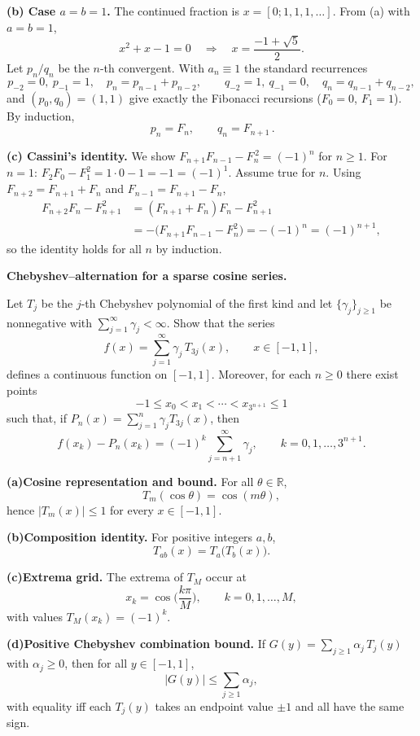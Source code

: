\begin{solution}
\textbf{(b) Case $a=b=1$.}
	The continued fraction is $x=[0;1,1,1,\ldots]$. From (a) with $a=b=1$,
	\[
	x^2+x-1=0 \quad\Rightarrow\quad x=\frac{-1+\sqrt5}{2}.
	\]
	Let $p_n/q_n$ be the $n$-th convergent. With $a_n\equiv1$ the standard recurrences
	\[
	p_{-2}=0,\ p_{-1}=1,\quad p_n=p_{n-1}+p_{n-2},\qquad
	q_{-2}=1,\ q_{-1}=0,\quad q_n=q_{n-1}+q_{n-2},
	\]
	and $(p_0,q_0)=(1,1)$ give exactly the Fibonacci recursions
	($F_0=0$, $F_1=1$). By induction,
	\[
	\boxed{\,p_n=F_n,\qquad q_n=F_{n+1}\,}.
	\]

	\medskip
	\textbf{(c) Cassini's identity.}
	We show $F_{n+1}F_{n-1}-F_n^{\,2}=(-1)^n$ for $n\ge1$.
	For $n=1$: $F_2F_0-F_1^2=1\cdot0-1=-1=(-1)^1$.
	Assume true for $n$. Using $F_{n+2}=F_{n+1}+F_n$ and $F_{n-1}=F_{n+1}-F_n$,
	\[
	\begin{aligned}
		F_{n+2}F_n - F_{n+1}^2
		&=(F_{n+1}+F_n)F_n - F_{n+1}^2\\
		&= -\bigl(F_{n+1}F_{n-1}-F_n^2\bigr)
		= -(-1)^n = (-1)^{n+1},
	\end{aligned}
	\]
	so the identity holds for all $n$ by induction.
\end{solution}

\begin{problem}[CP-II-0405]
\label{prob:cp-ii-0405}
\textbf{Chebyshev--alternation for a sparse cosine series.}

\hspace*{1.5em}Let $T_j$ be the $j$-th Chebyshev polynomial of the first kind and let
$\{\gamma_j\}_{j\ge 1}$ be nonnegative with $\sum_{j=1}^\infty \gamma_j<\infty$.
Show that the series
\[
f(x)=\sum_{j=1}^{\infty}\gamma_j\,T_{3j}(x),\qquad x\in[-1,1],
\]
defines a continuous function on $[-1,1]$. Moreover, for each $n\ge 0$ there exist points
\[
-1\le x_0<x_1<\cdots<x_{3^{n+1}}\le 1
\]
such that, if $P_n(x)=\sum_{j=1}^{n}\gamma_j T_{3j}(x)$, then
\[
f(x_k)-P_n(x_k)=(-1)^k\sum_{j=n+1}^{\infty}\gamma_j,\qquad k=0,1,\dots,3^{n+1}.
\]

	\par\smallskip\noindent\textbf{(a)}\quad \textbf{Cosine representation and bound.}
	For all $\theta\in\mathbb{R}$,
	\[
	T_m(\cos\theta)=\cos(m\theta),
	\]
	hence $\lvert T_m(x)\rvert\le 1$ for every $x\in[-1,1]$.

	\par\smallskip\noindent\textbf{(b)}\quad \textbf{Composition identity.}
	For positive integers $a,b$,
	\[
	T_{ab}(x)=T_a\!\big(T_b(x)\big).
	\]

	\par\smallskip\noindent\textbf{(c)}\quad \textbf{Extrema grid.}
	The extrema of $T_M$ occur at
	\[
	x_k=\cos\!\Big(\frac{k\pi}{M}\Big), \qquad k=0,1,\dots,M,
	\]
	with values $T_M(x_k)=(-1)^k$.

	\par\smallskip\noindent\textbf{(d)}\quad \textbf{Positive Chebyshev combination bound.}
	If $G(y)=\sum_{j\ge1}\alpha_j\,T_j(y)$ with $\alpha_j\ge 0$, then for all $y\in[-1,1]$,
	\[
	\lvert G(y)\rvert \le \sum_{j\ge1}\alpha_j,
	\]
	with equality iff each $T_j(y)$ takes an endpoint value $\pm 1$ and all have the same sign.
\end{problem}

